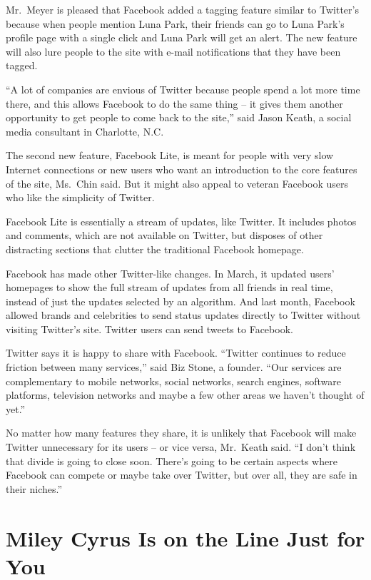 ﻿\documentclass[12pt]{article}
\begin{document}
Mr.~Meyer is pleased that Facebook added a tagging feature similar to Twitter's because when people
mention Luna Park, their friends can go to Luna Park's profile page with a single click and Luna
Park will get an alert. The new feature will also lure people to the site with e-mail notifications
that they have been tagged.

``A lot of companies are envious of Twitter because people spend a lot more time there, and this
allows Facebook to do the same thing -- it gives them another opportunity to get people to come back
to the site,'' said Jason Keath, a social media consultant in Charlotte, N.C.

The second new feature, Facebook Lite, is meant for people with very slow Internet connections or
new users who want an introduction to the core features of the site, Ms.~Chin said. But it might
also appeal to veteran Facebook users who like the simplicity of Twitter.

Facebook Lite is essentially a stream of updates, like Twitter. It includes photos and comments,
which are not available on Twitter, but disposes of other distracting sections that clutter the
traditional Facebook homepage.

Facebook has made other Twitter-like changes. In March, it updated users' homepages to show the full
stream of updates from all friends in real time, instead of just the updates selected by an
algorithm. And last month, Facebook allowed brands and celebrities to send status updates directly
to Twitter without visiting Twitter's site. Twitter users can send tweets to Facebook.

Twitter says it is happy to share with Facebook. ``Twitter continues to reduce friction between many
services,'' said Biz Stone, a founder. ``Our services are complementary to mobile networks, social
networks, search engines, software platforms, television networks and maybe a few other areas we
haven't thought of yet.''

No matter how many features they share, it is unlikely that Facebook will make Twitter unnecessary
for its users -- or vice versa, Mr.~Keath said. ``I don't think that divide is going to close soon.
There's going to be certain aspects where Facebook can compete or maybe take over Twitter, but over
all, they are safe in their niches\cite{niche}.''

\section{Miley Cyrus Is on the Line Just for You}
\end{document}
